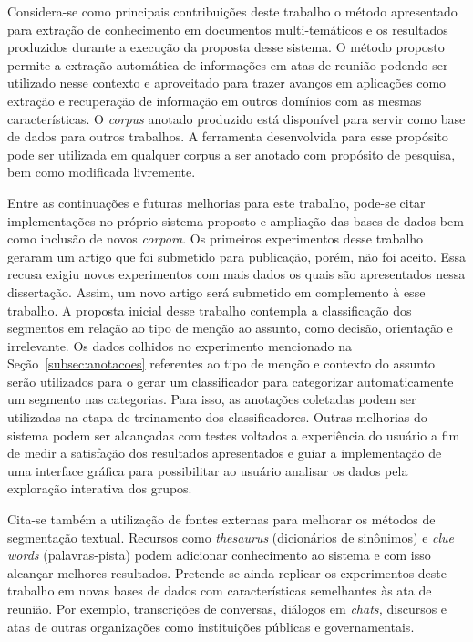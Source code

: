 Considera-se como principais contribuições deste trabalho o método apresentado para extração de conhecimento em documentos multi-temáticos e os resultados produzidos durante a execução da proposta desse sistema. O método proposto permite a extração automática de informações em atas de reunião podendo ser utilizado nesse contexto e aproveitado para trazer avanços em aplicações como extração e recuperação de informação em outros domínios com as mesmas características. O \textit{corpus} anotado produzido está disponível para servir como base de dados para outros trabalhos. A ferramenta desenvolvida para esse propósito pode ser utilizada em qualquer corpus a ser anotado com propósito de pesquisa, bem como modificada livremente. 








Entre as continuações e futuras melhorias para este trabalho, pode-se citar implementações no próprio sistema proposto e ampliação das bases de dados bem como inclusão de novos \textit{corpora}.  
%
Os primeiros experimentos desse trabalho geraram um artigo que foi submetido para publicação, porém, não foi aceito. Essa recusa exigiu novos experimentos com mais dados os quais são apresentados nessa dissertação. Assim, um novo artigo será submetido em complemento à esse trabalho.
% 
A proposta inicial desse trabalho contempla a classificação dos segmentos em relação ao tipo de menção ao assunto, como decisão, orientação e irrelevante. Os dados colhidos no experimento mencionado na Seção~\ref{subsec:anotacoes} referentes ao tipo de menção e contexto do assunto serão utilizados para o gerar um classificador para categorizar automaticamente um segmento nas categorias. Para isso, as anotações coletadas podem ser utilizadas na etapa de treinamento dos classificadores.
%
Outras melhorias do sistema podem ser alcançadas com testes voltados a experiência do usuário a fim de medir a satisfação dos resultados apresentados e guiar a implementação de uma interface gráfica para possibilitar ao usuário analisar os dados pela exploração interativa dos grupos.
%

Cita-se também a utilização de fontes externas para melhorar os métodos de segmentação textual. Recursos como \textit{thesaurus} (dicionários de sinônimos) e \textit{clue words} (palavras-pista) podem adicionar conhecimento ao sistema e com isso alcançar melhores resultados. 
%
Pretende-se ainda replicar os experimentos deste trabalho em novas bases de dados com características semelhantes às ata de reunião. Por exemplo, transcrições de conversas, diálogos em \textit{chats,} discursos e atas de outras organizações como instituições públicas e governamentais.  




